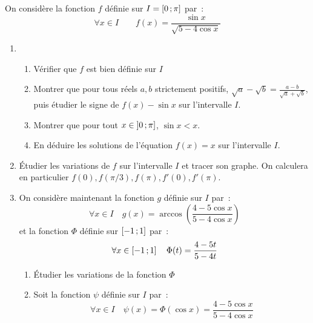 \begin{exercice}[Problème]
    On considère la fonction \(f\) définie sur \(I = \left[ 0 \, ;  \pi \right]\) par~:
    \begin{equation}
        \forall x \in I \qquad f(x) = \frac{\sin x}{\sqrt{5-4\cos x}}
    \end{equation}
    \begin{enumerate}
        \item 
            \begin{enumerate}
                \item Vérifier que \(f\) est bien définie sur \(I\)
                \item Montrer que pour tous réels \(a, b\) strictement positifs, \(\sqrt{a} - \sqrt{b} = \frac{a-b}{\sqrt{a}+\sqrt{b}}\), puis étudier le signe de \(f(x) - \sin x\) sur l'intervalle \(I\).
                \item Montrer que pour tout \(x \in \left] 0 \, ;  \pi \right]\), \(\sin x < x\).
                \item En déduire les solutions de l'équation \(f(x) = x\) sur l'intervalle \(I\).
            \end{enumerate}
        \item Étudier les variations de \(f\) sur l'intervalle \(I\) et tracer son graphe. On calculera en particulier \(f(0), f(\pi/3), f(\pi), f'(0), f'(\pi)\).
        \item On considère maintenant la fonction \(g\) définie sur \(I\) par~:
            \begin{equation}
                \forall x \in I \quad g(x) = \arccos\left(\frac{4-5\cos x}{5-4\cos x}\right)
            \end{equation}
            et la fonction \(\Phi\) définie sur \(\left[ -1 \, ;  1 \right]\) par~:
            \begin{equation}
                \forall x \in \left[ -1 \, ;  1 \right] \quad \Phi(t) = \frac{4-5t}{5-4t}
            \end{equation}
            \begin{enumerate}
                \item Étudier les variations de la fonction \(\Phi\)
                \item Soit la fonction \(\psi\) définie sur \(I\) par~:
                    \begin{equation}
                        \forall x \in I \quad \psi(x) = \Phi(\cos x) = \frac{4-5\cos x}{5-4\cos x}
                    \end{equation}

\end{enumerate}
\end{enumerate}
\end{exercice}
